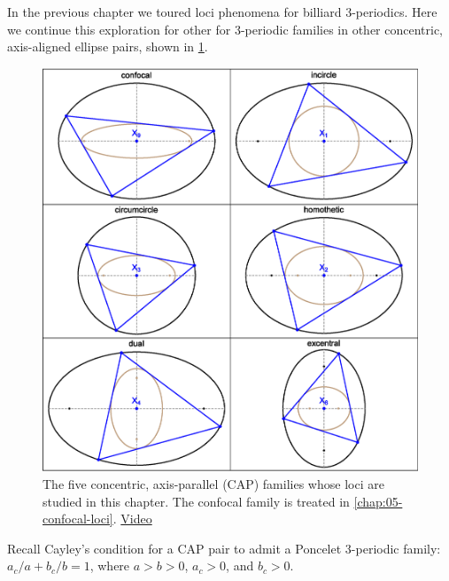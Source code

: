 In the previous chapter we toured loci phenomena for billiard 3-periodics. Here we continue this exploration for other for 3-periodic families in other concentric, axis-aligned ellipse pairs, shown in \cref{fig:06-six-caps}.

\begin{figure}
    \centering
    \includegraphics[width=\textwidth]{chap_06/pics/pics_06_015_six_caps_perp}
    \caption{The five concentric, axis-parallel (CAP) families whose loci are studied in this chapter. The confocal family is treated in \cref{chap:05-confocal-loci}. \href{https://youtu.be/14TQ5WlZxUw}{Video}}
    \label{fig:06-six-caps}
\end{figure}

Recall Cayley's condition for a CAP pair to admit a Poncelet 3-periodic family: $a_c/a+b_c/b=1$, where $a>b>0$, $a_c>0$, and $b_c>0$.

